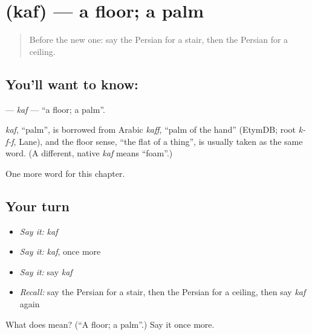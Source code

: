 \section[\texorpdfstring{\fa{کف} (kaf)}{کف (kaf)}]{ (kaf) — a floor; a palm}

\label{lesson:FA-C203-kaf}



\begin{quote}
Before the new one: say the Persian for a stair, then the Persian for a ceiling.
\end{quote}

\subsection*{You'll want to know: }
\textbf{} — \emph{kaf} — \textquotedblleft{}a floor; a palm\textquotedblright{}.

\begin{cousinweb}
\emph{kaf}, \textquotedblleft{}palm\textquotedblright{}, is borrowed from Arabic \emph{kaff}, \textquotedblleft{}palm of the hand\textquotedblright{} (EtymDB; root \emph{k-f-f}, Lane), and the floor sense, \textquotedblleft{}the flat of a thing\textquotedblright{}, is usually taken as the same word. (A different, native \emph{kaf} means \textquotedblleft{}foam\textquotedblright{}.)
\end{cousinweb}

\begin{grammarlens}[title={What you've built}]
One more word for this chapter.
\end{grammarlens}

\subsection*{Your turn}
\begin{itemize}
\raggedright
  \item \emph{Say it:} \emph{kaf}
  \item \emph{Say it:} \emph{kaf}, once more
  \item \emph{Say it:} say \emph{kaf}
  \item \emph{Recall:} say the Persian for a stair, then the Persian for a ceiling, then say \emph{kaf} again
\end{itemize}

\begin{tcolorbox}[breakable,colback=teal!4,colframe=teal!35!black,title={Before you move on}]
What does  mean? (\textquotedblleft{}A floor; a palm\textquotedblright{}.) Say it once more.
\end{tcolorbox}
